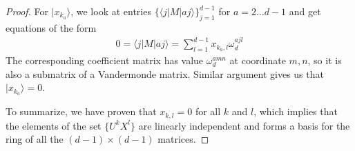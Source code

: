 \documentclass[11pt,letterpaper]{article}
\newcommand{\ket}[1]{|#1\rangle}
\newcommand{\bra}[1]{\langle#1|}
\newcommand{\ketbra}[2]{|#1\rangle\langle#2|}
\newcommand{\1}{\mathbb{1}}
\newcommand{\Pg}{\mathcal{P}}
\newcommand{\J}{\mathcal{J}}
\newcommand{\paulix}[1]{\sigma_x^{(#1)}}
\newcommand{\pauliz}[1]{\sigma_z^{(#1)}}
\newcommand{\G}[1]{G^{(#1)}}
\newcommand{\LS}{LS}
\theoremstyle{definition}
\begin{document}
\begin{proof}
For $\ket{x_{k_a}}$, we look at entries $\{\bra{j}M\ket{aj}\}_{j=1}^{d-1}$ for $a = 2 \dots d-1$ and get equations
of the form
\begin{align}
	0 = \bra{j}M\ket{aj} = \sum_{l=1}^{d-1} x_{k_a, l} \omega_d^{ajl} 
\end{align}
The corresponding coefficient matrix has value $\omega_d^{amn}$ at coordinate $m,n$,
so it is also a submatrix of a Vandermonde matrix. Similar argument gives us that $\ket{x_{k_a}} = 0$.

To summarize, we have proven that $x_{k,l} = 0$ for all $k$ and $l$, which implies that the elements of the set
$\{ U^k X^l \}$ are linearly independent and forms a basis for the ring of all the $(d-1)\times(d-1)$ matrices.
\end{proof}
%
\end{document}
